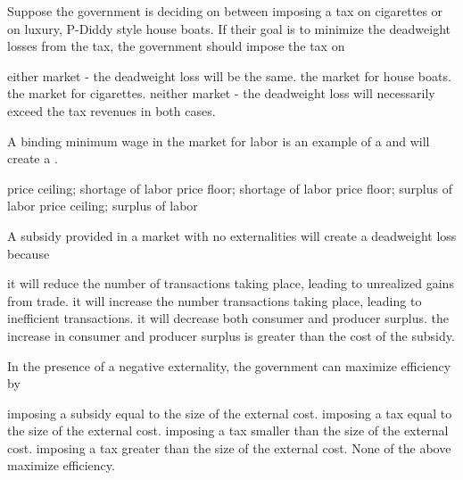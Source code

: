 \documentclass[addpoints,11pt]{exam}
\theoremstyle{definition}
\newcommand{\blank}[0]{\underline{\hspace{3cm}}}
\begin{document}
\begin{questions}
\newpage

\question Suppose the government is deciding on between imposing a tax on cigarettes or on luxury, P-Diddy style house boats. If their goal is to minimize the deadweight losses from the tax, the government should impose the tax on

\begin{choices}
	\choice either market - the deadweight loss will be the same.
	\choice the market for house boats.
	\CorrectChoice the market for cigarettes.
	\choice neither market - the deadweight loss will necessarily exceed the tax revenues in both cases.
\end{choices}

\question A binding minimum wage in the market for labor is an example of a \blank and will create a \blank.

\begin{choices}
	\choice price ceiling; shortage of labor
	\choice price floor; shortage of labor
	\CorrectChoice price floor; surplus of labor
	\choice price ceiling; surplus of labor
\end{choices}




\question A subsidy provided in a market with no externalities will create a deadweight loss because 

\begin{choices}
	\choice it will reduce the number of transactions taking place, leading to unrealized gains from trade.
	\CorrectChoice it will increase the number transactions taking place, leading to inefficient transactions.
	\choice it will decrease both consumer and producer surplus.
	\choice the increase in consumer and producer surplus is greater than the cost of the subsidy.
\end{choices}



\question In the presence of a negative externality, the government can maximize efficiency by

\begin{choices}
	\choice imposing a subsidy equal to the size of the external cost.
	\CorrectChoice imposing a tax equal to the size of the external cost.
	\choice imposing a tax smaller than the size of the external cost.
	\choice imposing a tax greater than the size of the external cost.
	\choice None of the above maximize efficiency.
\end{choices}


\end{questions}
\end{document}
